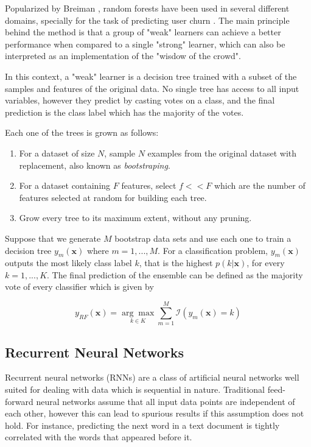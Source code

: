 \documentclass{kththesis}
\begin{document}
Popularized by Breiman \citep{breiman2001random}, random forests have been used in several different domains, specially for the task of predicting user churn \citep{coussement2013customer} \citep{burez2008separating}. The main principle behind the method is that a group of "weak" learners can achieve a better performance when compared to a single "strong" learner, which can also be interpreted as an implementation of the "wisdow of the crowd". 

In this context, a "weak" learner is a decision tree trained with a subset of the samples and features of the original data. No single tree has access to all input variables, however they predict by casting votes on a class, and the final prediction is the class label which has the majority of the votes.

Each one of the trees is grown as follows:

\begin{enumerate}
\item For a dataset of size $N$, sample $N$ examples from the original dataset with replacement, also known as \emph{bootstraping}.
\item For a dataset containing $F$ features, select $f<<F$ which are the number of features selected at random for building each tree.
\item Grow every tree to its maximum extent, without any pruning.
\end{enumerate}

Suppose that we generate $M$ bootstrap data sets and use each one to train a decision tree $y_m(\mathbf{x})$ where $m=1,...,M$. For a classification problem, $y_m(\mathbf{x})$ outputs the most likely class label $k$, that is the highest $p(k|\mathbf{x})$, for every $k=1,...,K$. The final prediction of the ensemble can be defined as the majority vote of every classifier which is given by

\begin{equation}
y_\textit{RF}(\mathbf{x}) = \underset{k \in K}{\arg\max} \sum_{m=1}^M \mathcal{I}(y_m(\mathbf{x}) = k)
\end{equation}

\subsection{Recurrent Neural Networks}

Recurrent neural networks (RNNs) are a class of artificial neural networks well suited for dealing with data which is sequential in nature. Traditional feed-forward neural networks assume that all input data points are independent of each other, however this can lead to spurious results if this assumption does not hold. For instance, predicting the next word in a text document is tightly correlated with the words that appeared before it. 
\end{document}
